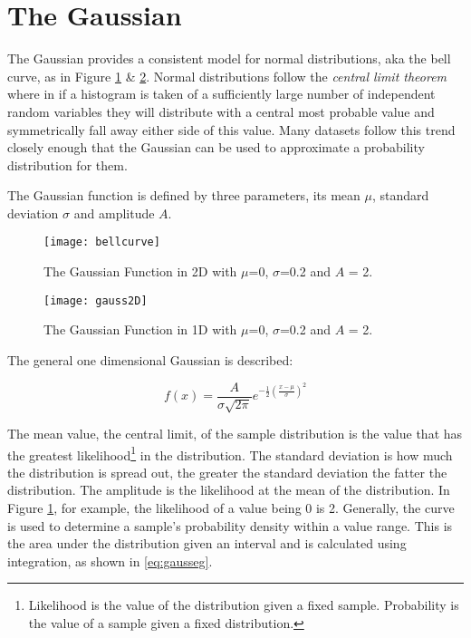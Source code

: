\section{The Gaussian}
\label{section:gaussian}


The Gaussian provides a consistent model for normal distributions, aka the bell curve, as in Figure \ref{fig:gauss} \& \ref{fig:gausssurf}. Normal distributions follow the \emph{central limit theorem} where in if a histogram is taken of a sufficiently large number of independent random variables they will distribute with a central most probable value and symmetrically fall away either side of this value. Many datasets follow this trend closely enough that the Gaussian can be used to approximate a probability distribution for them. 

The Gaussian function  is defined by three parameters, its mean $\mu$, standard deviation $\sigma$ and amplitude $A$.

\begin{figure}[H]
    \centering
    \centering\texttt{[image: bellcurve]}
    \caption{The Gaussian Function in 2D with $\mu$=0, $\sigma$=0.2 and $A$ = 2.}
    \label{fig:gauss}
  \end{figure}

  \begin{figure}[H]
    \centering
    \centering\texttt{[image: gauss2D]}
    \caption{The Gaussian Function in 1D with $\mu$=0, $\sigma$=0.2 and $A$ = 2.}
    \label{fig:gausssurf}
  \end{figure}

  
  
  The general one dimensional Gaussian is described:  

\begin{equation}
    f(x) = \frac{A}{\sigma\sqrt{2\pi}}e^{-\frac{1}{2}(\frac{x-\mu}{\sigma})^2}
\label{eq:gauss}
\end{equation}

  The mean value, the central limit, of the sample distribution is the value that has the greatest likelihood\footnote{Likelihood is the value of the distribution given a fixed sample. Probability is the value of a sample given a fixed distribution.} in the distribution. The standard deviation is how much the distribution is spread out, the greater the standard deviation the fatter the distribution. The amplitude is the likelihood at the mean of the distribution. In Figure \ref{fig:gauss}, for example, the likelihood of a value being 0 is 2. Generally, the curve is used to determine a sample's probability density within a value range. This is the area under the distribution given an interval and is calculated using integration, as shown in \ref{eq:gausseg}.
  
